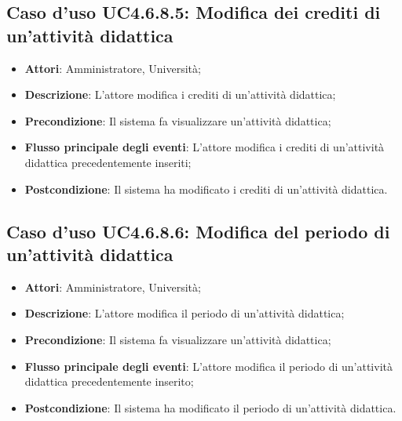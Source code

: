 \subsection{Caso d'uso \texorpdfstring{UC4.6.8.5}{UC4.6.8.5}: Modifica dei crediti di un'attività didattica}
\begin{itemize}
	\item \textbf{Attori}: Amministratore, Università;
	\item \textbf{Descrizione}: L'attore modifica i crediti di un'attività didattica;
	
	\item \textbf{Precondizione}: Il sistema fa visualizzare un'attività didattica;
	
	
	\item \textbf{Flusso principale degli eventi}: L'attore modifica i crediti di un'attività didattica precedentemente inseriti;
	
	\item \textbf{Postcondizione}: Il sistema ha modificato i crediti di un'attività didattica.
	
\end{itemize}
\subsection{Caso d'uso \texorpdfstring{UC4.6.8.6}{UC4.6.8.6}: Modifica del periodo di un'attività didattica}
\begin{itemize}
	\item \textbf{Attori}: Amministratore, Università;
	\item \textbf{Descrizione}: L'attore modifica il periodo di un'attività didattica;
	
	\item \textbf{Precondizione}: Il sistema fa visualizzare un'attività didattica;
	
	
	\item \textbf{Flusso principale degli eventi}: L'attore modifica il periodo di un'attività didattica precedentemente inserito;
	
	\item \textbf{Postcondizione}: Il sistema ha modificato il periodo di un'attività didattica.
	
\end{itemize}
